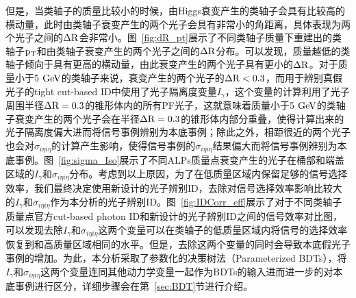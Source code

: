 但是，当类轴子的质量比较小的时候，由Higgs衰变产生的类轴子会具有比较高的横动量，此时由类轴子衰变产生的两个光子会具有非常小的角距离，具体表现为两个光子之间的$\mathrm{\Delta R}$会非常小。图~\ref{fig:dR_pt}展示了不同类轴子质量下重建出的类轴子$\mathrm{p_{T}}$和由类轴子衰变产生的两个光子之间的$\mathrm{\Delta R}$分布。可以发现，质量越低的类轴子倾向于具有更高的横动量，由此衰变产生的两个光子具有更小的$\mathrm{\Delta R}$。对于质量小于5$\GeV$的类轴子来说，衰变产生的两个光子的$\mathrm{\Delta R}<0.3$，而用于辨别真假光子的tight cut-based ID中使用了光子隔离度变量$I_{\gamma}$，这个变量的计算利用了光子周围半径$\mathrm{\Delta R}=0.3$的锥形体内的所有PF光子，这就意味着质量小于5$\GeV$的类轴子衰变产生的两个光子会在半径$\mathrm{\Delta R}=0.3$的锥形体内部分重叠，使得计算出来的光子隔离度偏大进而将信号事例辨别为本底事例；除此之外，相距很近的两个光子也会对$\sigma_{i\eta i\eta}$的计算产生影响，使得信号事例的$\sigma_{i\eta i\eta}$结果偏大而将信号事例辨别为本底事例。图~\ref{fig:sigma_Iso}展示了不同ALPs质量点衰变产生的光子在桶部和端盖区域的$I_{\gamma}$和$\sigma_{i\eta i\eta}$分布。考虑到以上原因，为了在低质量区域内保留足够的信号选择效率，我们最终决定使用新设计的光子辨别ID，去除对信号选择效率影响比较大的$I_{\gamma}$和$\sigma_{i\eta i\eta}$作为本分析的光子辨别ID。图~\ref{fig:IDCorr_eff}展示了对于不同类轴子质量点官方cut-based photon ID和新设计的光子辨别ID之间的信号效率对比图，可以发现去除$I_{\gamma}$和$\sigma_{i\eta i\eta}$这两个变量可以在类轴子的低质量区域内将信号的选择效率恢复到和高质量区域相同的水平。但是，去除这两个变量的同时会导致本底假光子事例的增加。为此，本分析采取了参数化的决策树法（Parameterized BDTs），将$I_{\gamma}$和$\sigma_{i\eta i\eta}$这两个变量连同其他动力学变量一起作为BDTs的输入进而进一步的对本底事例进行区分，详细步骤会在第~\ref{sec:BDT}节进行介绍。

